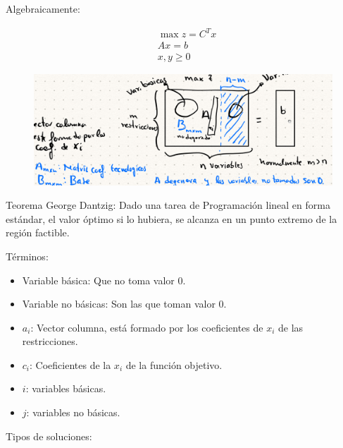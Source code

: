 \documentclass[12pt, twoside, openright]{report} %
\begin{document}
    Algebraicamente:

    $$\begin{aligned}  &\max z = C^{T}x \\  &Ax = b \\ &x, y\geqslant 0 \end{aligned}$$
	\begin{figure}[H]
		{\includegraphics[scale=.3]{Untitled 9.png}}
	\end{figure}

	Teorema George Dantzig: Dado una tarea de Programación lineal en forma
  estándar, el valor óptimo si lo hubiera, se alcanza en un punto
  extremo de la región factible.


  
    Términos:
	\begin{itemize}
		\item Variable básica: Que no toma valor 0.
		\item
		Variable no básicas: Son las que toman valor 0.
	  \item
		\(a_i\): Vector columna, está formado por los coeficientes de
		\(x_i\) de las restricciones.
	  \item
		\(c_i\): Coeficientes de la \(x_i\) de la función objetivo.
	  \item
		\(i\): variables básicas.
	  \item
		\(j\): variables no básicas.
	\end{itemize}

	\pagebreak
    Tipos de soluciones:
\end{document}
